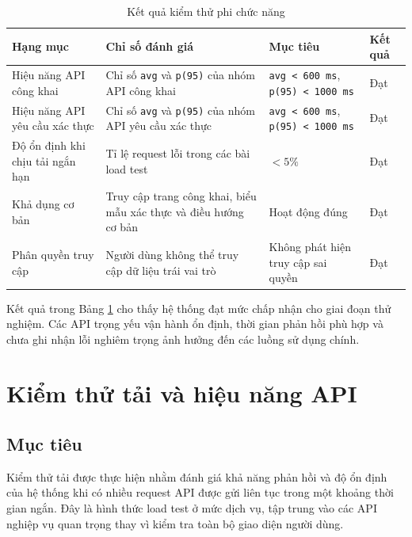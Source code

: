 \begin{table}[H]
\centering
\caption{Kết quả kiểm thử phi chức năng}
\label{tab:non-functional-results}
\small
\begin{tabular}{|p{2.8cm}|p{4.4cm}|p{3.0cm}|p{2.8cm}|}
\hline
\textbf{Hạng mục} & \textbf{Chỉ số đánh giá} & \textbf{Mục tiêu} & \textbf{Kết quả} \\ \hline

Hiệu năng API công khai & Chỉ số \texttt{avg} và \texttt{p(95)} của nhóm API công khai & \texttt{avg < 600 ms}, \texttt{p(95) < 1000 ms} & Đạt \\ \hline

Hiệu năng API yêu cầu xác thực & Chỉ số \texttt{avg} và \texttt{p(95)} của nhóm API yêu cầu xác thực & \texttt{avg < 600 ms}, \texttt{p(95) < 1000 ms} & Đạt \\ \hline

Độ ổn định khi chịu tải ngắn hạn & Tỉ lệ request lỗi trong các bài load test & $< 5\%$ & Đạt \\ \hline

Khả dụng cơ bản & Truy cập trang công khai, biểu mẫu xác thực và điều hướng cơ bản & Hoạt động đúng & Đạt \\ \hline

Phân quyền truy cập & Người dùng không thể truy cập dữ liệu trái vai trò & Không phát hiện truy cập sai quyền & Đạt \\ \hline
\end{tabular}
\end{table}

Kết quả trong Bảng \ref{tab:non-functional-results} cho thấy hệ thống đạt mức chấp nhận cho giai đoạn thử nghiệm. Các API trọng yếu vận hành ổn định, thời gian phản hồi phù hợp và chưa ghi nhận lỗi nghiêm trọng ảnh hưởng đến các luồng sử dụng chính.

\section{Kiểm thử tải và hiệu năng API}

\subsection{Mục tiêu}

Kiểm thử tải được thực hiện nhằm đánh giá khả năng phản hồi và độ ổn định của hệ thống khi có nhiều request API được gửi liên tục trong một khoảng thời gian ngắn. Đây là hình thức load test ở mức dịch vụ, tập trung vào các API nghiệp vụ quan trọng thay vì kiểm tra toàn bộ giao diện người dùng.

